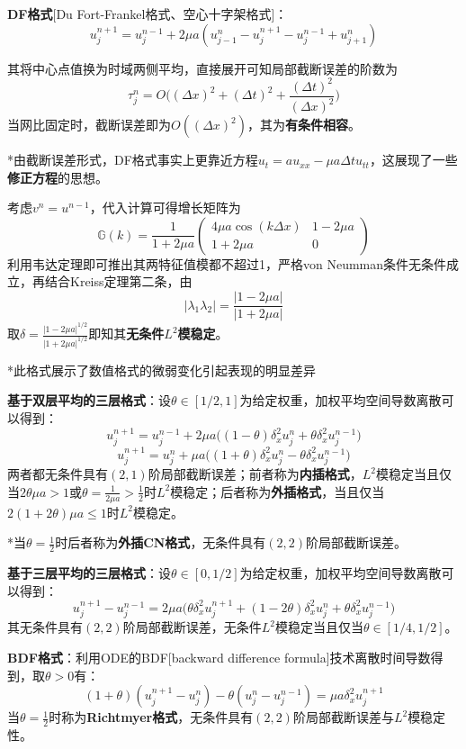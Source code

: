 \documentclass[a4paper,UTF8,fontset=windows]{ctexart}
\begin{document}
\textbf{DF格式}[Du Fort-Frankel格式、空心十字架格式]：
$$u_j^{n+1}=u_j^{n-1}+2\mu a(u_{j-1}^n-u_j^{n+1}-u_j^{n-1}+u_{j+1}^n)$$

其将中心点值换为时域两侧平均，直接展开可知局部截断误差的阶数为
$$\tau_j^n=O\bigg((\Delta x)^2+(\Delta t)^2+\frac{(\Delta t)^2}{(\Delta x)^2}\bigg)$$
当网比固定时，截断误差即为$O((\Delta x)^2)$，其为\textbf{有条件相容}。

*由截断误差形式，DF格式事实上更靠近方程$u_t=au_{xx}-\mu a\Delta tu_{tt}$，这展现了一些\textbf{修正方程}的思想。

考虑$v^n=u^{n-1}$，代入计算可得增长矩阵为
$$\mathbb{G}(k)=\frac{1}{1+2\mu a}\begin{pmatrix}4\mu a\cos(k\Delta x)&1-2\mu a\\1+2\mu a&0\end{pmatrix}$$
利用韦达定理即可推出其两特征值模都不超过1，严格von Neumman条件无条件成立，再结合Kreiss定理第二条，由
$$|\lambda_1\lambda_2|=\frac{|1-2\mu a|}{|1+2\mu a|}$$
取$\delta=\frac{|1-2\mu a|^{1/2}}{|1+2\mu a|^{1/2}}$即知其\textbf{无条件$L^2$模稳定}。

*此格式展示了数值格式的微弱变化引起表现的明显差异

\textbf{基于双层平均的三层格式}：设$\theta\in[1/2,1]$为给定权重，加权平均空间导数离散可以得到：
$$u_j^{n+1}=u_j^{n-1}+2\mu a\big((1-\theta)\delta_x^2u_j^n+\theta\delta_x^2u_j^{n-1}\big)$$
$$u_j^{n+1}=u_j^n+\mu a\big((1+\theta)\delta_x^2u_j^n-\theta\delta_x^2u_j^{n-1}\big)$$
两者都无条件具有$(2,1)$阶局部截断误差；前者称为\textbf{内插格式}，$L^2$模稳定当且仅当$2\theta\mu a>1$或$\theta=\frac{1}{2\mu a}>\frac{1}{2}$时$L^2$模稳定；后者称为\textbf{外插格式}，当且仅当$2(1+2\theta)\mu a\le1$时$L^2$模稳定。

*当$\theta=\frac{1}{2}$时后者称为\textbf{外插CN格式}，无条件具有$(2,2)$阶局部截断误差。

\textbf{基于三层平均的三层格式}：设$\theta\in[0,1/2]$为给定权重，加权平均空间导数离散可以得到：
$$u_j^{n+1}-u_j^{n-1}=2\mu a\big(\theta\delta_x^2u_j^{n+1}+(1-2\theta)\delta_x^2u_j^n+\theta\delta_x^2u_j^{n-1}\big)$$
其无条件具有$(2,2)$阶局部截断误差，无条件$L^2$模稳定当且仅当$\theta\in[1/4,1/2]$。

\textbf{BDF格式}：利用ODE的BDF[backward difference formula]技术离散时间导数得到，取$\theta>0$有：
$$(1+\theta)(u_j^{n+1}-u_j^n)-\theta(u_j^n-u_j^{n-1})=\mu a\delta_x^2u_j^{n+1}$$
当$\theta=\frac{1}{2}$时称为\textbf{Richtmyer格式}，无条件具有$(2,2)$阶局部截断误差与$L^2$模稳定性。

\
\end{document}
